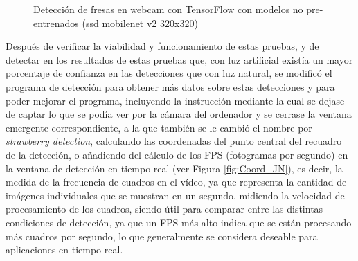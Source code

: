 \begin{figure}[H]
    \hspace{1mm}
    \hspace{1mm}
    
    \caption{Detección de fresas en webcam con TensorFlow con modelos no pre-entrenados (ssd mobilenet v2 320x320)}
    \label{fig:deteccion_Fresas_webcam_TF_ssdmobilenet}
\end{figure}

Después de verificar la viabilidad y funcionamiento de estas pruebas, y de detectar en los resultados de estas pruebas que, con luz artificial existía un mayor porcentaje de confianza en las detecciones que con luz natural, se modificó el programa de detección para obtener más datos sobre estas detecciones y para poder mejorar el programa, incluyendo la instrucción mediante la cual se dejase de captar lo que se podía ver por la cámara del ordenador y se cerrase la ventana emergente correspondiente, a la que también se le cambió el nombre por \textit{strawberry detection}, calculando las coordenadas del punto central del recuadro de la detección, o añadiendo del cálculo de los FPS (fotogramas por segundo) en la ventana de detección en tiempo real (ver Figura \ref{fig:Coord_JN}), es decir, la medida de la frecuencia de cuadros en el vídeo, ya que representa la cantidad de imágenes individuales que se muestran en un segundo, midiendo la velocidad de procesamiento de los cuadros, siendo útil para comparar entre las distintas condiciones de detección, ya que un FPS más alto indica que se están procesando más cuadros por segundo, lo que generalmente se considera deseable para aplicaciones en tiempo real.\\ 

